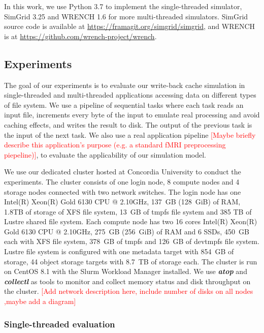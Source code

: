 \documentclass[conference]{IEEEtran}
\begin{document}
			In this work, we use Python 3.7 to implement the single-threaded simulator, 
			SimGrid 3.25 and WRENCH 1.6 for more multi-threaded simulators. 
			SimGrid source code is available at \url{https://framagit.org/simgrid/simgrid}, 
			and WRENCH is at \url{https://github.com/wrench-project/wrench}.
			
		\subsection{Experiments}
		
        	The goal of our experiments is to evaluate our write-back cache 
			simulation in single-threaded and multi-threaded applications
			accessing data on different types of file system. We use a pipeline
			of sequential tasks where each task reads an input file, increments
			every byte of the input to emulate real processing and avoid caching
			effects, and writes the result to disk. The output of the previous
			task is the input of the next task. We also use a real application 
            pipeline \textcolor{red}{[Maybe briefly describe this application's purpose (e.g. a standard fMRI preprocessing piepeline)]}, to evaluate the applicability of our simulation model. 
			
			We use our dedicated cluster hosted at Concordia University to conduct 
			the experiments. The cluster consists of one login node, 8 compute nodes 
			and 4 storage nodes connected with two network switches. The login node 
			has one Intel(R) Xeon(R) Gold 6130 CPU @ 2.10GHz, 137~GB (128~GiB) of RAM, 
			1.8TB of storage of XFS file system, 13~GB of tmpfs file system and 385 TB of 
			Lustre shared file system. Each compute node has two 16 cores Intel(R) 
			Xeon(R) Gold 6130 CPU @ 2.10GHz, 275~GB (256~GiB) of RAM and 6 SSDs, 
			450~GB each with XFS file system, 378~GB of tmpfs and 126~GB of devtmpfs file system.
			Lustre file system is configured with one metadata target with 854~GB 
			of storage, 44 object storage targets with 8.7~TB of storage each. 
			The cluster is run on CentOS 8.1 with the Slurm Workload Manager installed. 
			We use \textbf{\textit{atop}} and \textbf{\textit{collectl}} as tools to 
			monitor and collect memory status and disk throughput 
			on the cluster. 
			\textcolor{red}{[Add network description here, include number of disks 
			on all nodes ,maybe add a diagram]}
			
			\subsubsection{Single-threaded evaluation}
			
\end{document}
